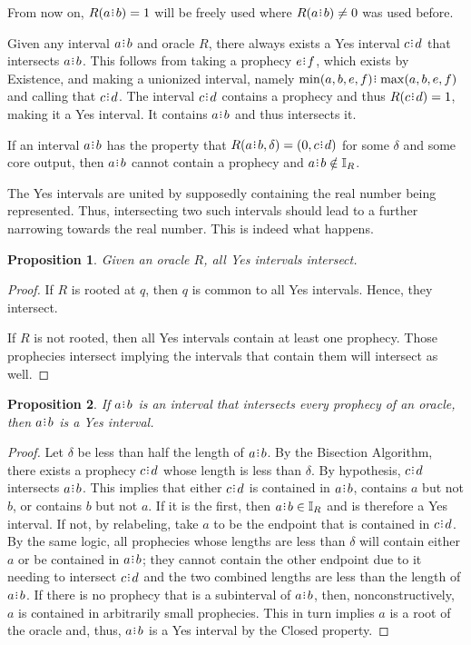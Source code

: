 \documentclass[12pt]{article}
\newtheorem{proposition}{Proposition}[section]
\begin{document}
From now on, $R(a\rint b)=1$ will be freely used where $R(a\rint b) \neq 0$ was used before. 


Given any interval $a\rint b$ and oracle $R$, there always exists a Yes interval $c\rint d$ that intersects $a\rint b$. This follows from taking a prophecy $e\rint f$, which exists by Existence, and making a unionized interval, namely $\min(a,b,e,f)\rint \max(a,b,e,f)$ and calling that $c\rint d$. The interval $c\rint d$ contains a prophecy and thus $R(c\rint d) = 1$, making it a Yes interval. It contains $a\rint b$ and thus intersects it. 

If an interval $a\rint b$ has the property that $R(a\rint b, \delta) = (0, c\rint d)$ for some $\delta$ and some core output, then $a\rint b$ cannot contain a prophecy and $a\rint b \notin \mathbb{I}_R$. 

The Yes intervals are united by supposedly containing the real number being represented. Thus, intersecting two such intervals should lead to a further narrowing towards the real number. This is indeed what happens. 

\begin{proposition}\label{os-yesinter}
    Given an oracle $R$, all Yes intervals intersect. 
\end{proposition}

\begin{proof}
    If $R$ is rooted at $q$, then $q$ is common to all Yes intervals. Hence, they intersect. 

    If $R$ is not rooted, then all Yes intervals contain at least one prophecy. Those prophecies intersect implying the intervals that contain them will intersect as well. 
\end{proof}


\begin{proposition}\label{os-inter}
    If $a\rint b$ is an interval that intersects every prophecy of an oracle, then $a\rint b$ is a Yes interval. 
\end{proposition}

\begin{proof}
    Let $\delta$ be less than half the length of $a\rint b$. By the Bisection Algorithm, there exists a prophecy $c\rint d$ whose length is less than $\delta$. By hypothesis, $c\rint d$ intersects $a\rint b$. This implies that either $c\rint d$ is contained in $a\rint b$, contains $a$ but not $b$, or contains $b$ but not $a$. If it is the first, then $a\rint b \in \mathbb{I}_R$ and is therefore a Yes interval. If not, by relabeling, take $a$ to be the endpoint that is contained in $c\rint d$. By the same logic, all prophecies whose lengths are less than $\delta$ will contain either $a$ or be contained in $a\rint b$; they cannot contain the other endpoint due to it needing to intersect $c\rint d$ and the two combined lengths are less than the length of $a\rint b$. If there is no prophecy that is a subinterval of $a\rint b$, then, nonconstructively, $a$ is contained in arbitrarily small prophecies. This in turn implies $a$ is a root of the oracle and, thus, $a\rint b$ is a Yes interval by the Closed property. 
\end{proof}
\end{document}
